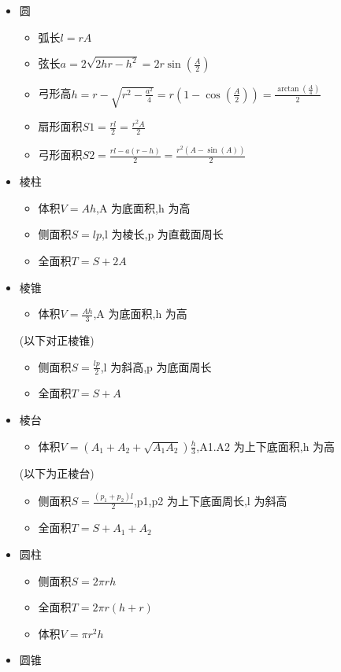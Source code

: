 \begin{itemize}
\begin{itemize}
\end{itemize}
\item 圆
\begin{itemize}
\item 弧长$l=rA$
\item 弦长$a=2\sqrt{2hr-h^2}=2r\sin(\frac{A}{2})$
\item 弓形高$h=r-\sqrt{r^2-\frac{a^2}{4}}=r(1-\cos(\frac{A}{2}))=\frac{\arctan(\frac{A}{4})}{2}$
\item 扇形面积$S1=\frac{rl}{2}=\frac{r^2A}{2}$
\item 弓形面积$S2=\frac{rl-a(r-h)}{2}=\frac{r^2(A-\sin(A))}{2}$
\end{itemize}
\item 棱柱
\begin{itemize}
\item 体积$V=Ah$,A 为底面积,h 为高
\item 侧面积$S=lp$,l 为棱长,p 为直截面周长
\item 全面积$T=S+2A$
\end{itemize}
\item 棱锥
\begin{itemize}
\item 体积$V=\frac{Ah}{3}$,A 为底面积,h 为高
\end{itemize}
(以下对正棱锥)
\begin{itemize}
\item 侧面积$S=\frac{lp}{2}$,l 为斜高,p 为底面周长
\item 全面积$T=S+A$
\end{itemize}
\item 棱台
\begin{itemize}
\item 体积$V=(A_1+A_2+\sqrt{A_1A_2})\frac{h}{3}$,A1.A2 为上下底面积,h 为高
\end{itemize}
(以下为正棱台)
\begin{itemize}
\item 侧面积$S=\frac{(p_{1}+p_{2})l}{2}$,p1,p2 为上下底面周长,l 为斜高
\item 全面积$T=S+A_1+A_2$
\end{itemize}
\item 圆柱
\begin{itemize}
\item 侧面积$S=2\pi rh$
\item 全面积$T=2\pi r(h+r)$
\item 体积$V=\pi r^2h$
\end{itemize}
\item 圆锥
\begin{itemize}

\end{itemize}
\end{itemize}
